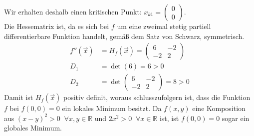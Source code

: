 \documentclass[10pt,a4paper,parskip=half]{scrartcl}
\begin{document}
Wir erhalten deshalb einen kritischen Punkt: $x_{k1} = \begin{pmatrix}0 \\ 0\end{pmatrix}$.\\
Die Hessematrix ist, da es sich bei $f$ um eine zweimal stetig partiell differentierbare Funktion handelt, gemäß dem Satz von Schwarz, symmetrisch.
\begin{align*}
f''(\vec x) &= H_f(\vec x) =  \begin{pmatrix}6 & -2 \\ -2 & 2\end{pmatrix}\\
D_1 &= \det (6) = 6 > 0\\
D_2 &= \det \begin{pmatrix} 6 & -2 \\ -2 & 2\end{pmatrix} = 8 > 0
\end{align*}
Damit ist $H_f(\vec x)$ positiv definit, woraus schlusszufolgern ist, dass die Funktion $f$ bei $f(0,0) = 0$ ein lokales Minimum besitzt. Da $f(x,y)$ eine Komposition aus $(x-y)^2 > 0 \; \; \forall x,y \in \mathbb{R}$ und $2x^2 > 0 \; \; \forall x \in \mathbb{R}$ ist, ist $f(0,0) = 0$ sogar ein globales Minimum.
\end{document}
